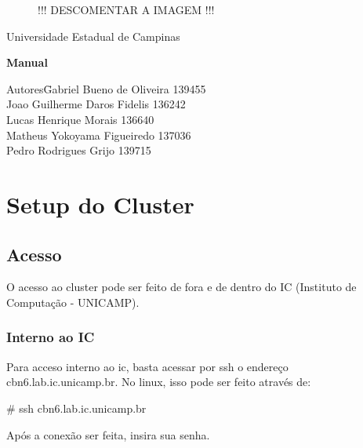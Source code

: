 \documentclass[a4paper,10pt]{article}
\date{\today}
\begin{document}
    \begin{titlepage}
        \begin{figure}
            \centering
!!! DESCOMENTAR A IMAGEM !!!

        \end{figure}
        \begin{center}
            \huge{Universidade Estadual de Campinas}

        \vfill
        \textbf{\LARGE{Manual}}
        \vfill
        \end{center}

        \begin{flushleft}
            \begin{tabbing}
                Autores\qquad\qquad\= Gabriel Bueno de Oliveira 139455 \\
                    \>Joao Guilherme Daros Fidelis 136242 \\
                    \>Lucas Henrique Morais 136640 \\
                    \>Matheus Yokoyama Figueiredo 137036\\
                    \>Pedro Rodrigues Grijo 139715\\
            \end{tabbing}
        \end{flushleft}
    \end{titlepage}

\newpage
\section{Setup do Cluster}
    \subsection{Acesso}
    O acesso ao cluster pode ser feito de fora e de dentro do IC (Instituto de Computação - UNICAMP).
        \subsubsection{Interno ao IC}
        Para acceso interno ao ic, basta acessar por ssh o endereço cbn6.lab.ic.unicamp.br. No linux, isso pode ser feito através de:
        \begin{spverbatim}
        # ssh cbn6.lab.ic.unicamp.br
        \end{spverbatim}

        Após a conexão ser feita, insira sua senha.
\end{document}
